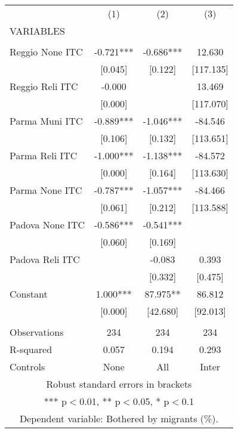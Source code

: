\begin{tabular}{lccc} \hline
 & (1) & (2) & (3) \\
VARIABLES &  &  &  \\ \hline
 &  &  &  \\
Reggio None ITC & -0.721*** & -0.686*** & 12.630 \\
 & [0.045] & [0.122] & [117.135] \\
Reggio Reli ITC & -0.000 &  & 13.469 \\
 & [0.000] &  & [117.070] \\
Parma Muni ITC & -0.889*** & -1.046*** & -84.546 \\
 & [0.106] & [0.132] & [113.651] \\
Parma Reli ITC & -1.000*** & -1.138*** & -84.572 \\
 & [0.000] & [0.164] & [113.630] \\
Parma None ITC & -0.787*** & -1.057*** & -84.466 \\
 & [0.061] & [0.212] & [113.588] \\
Padova None ITC & -0.586*** & -0.541*** &  \\
 & [0.060] & [0.169] &  \\
Padova Reli ITC &  & -0.083 & 0.393 \\
 &  & [0.332] & [0.475] \\
Constant & 1.000*** & 87.975** & 86.812 \\
 & [0.000] & [42.680] & [92.013] \\
 &  &  &  \\
Observations & 234 & 234 & 234 \\
R-squared & 0.057 & 0.194 & 0.293 \\
 Controls & None & All & Inter \\ \hline
\multicolumn{4}{c}{ Robust standard errors in brackets} \\
\multicolumn{4}{c}{ *** p$<$0.01, ** p$<$0.05, * p$<$0.1} \\
\multicolumn{4}{c}{ Dependent variable: Bothered by migrants (\%).} \\
\end{tabular}
